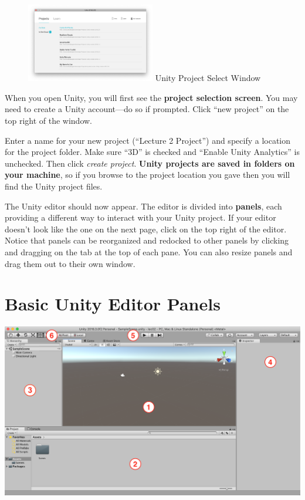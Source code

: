 \documentclass[11pt]{article}
\begin{document}
\begin{figure}
    \centering
    \includegraphics[width=0.5\textwidth]{proj-select}
    Unity Project Select Window
\end{figure}


When you open Unity, you will first see the {\bf project selection screen}.  You may need to create a Unity account—do so if prompted.  Click ``new project'' on the top right of the window.

Enter a name for your new project (``Lecture 2 Project'') and specify a location for the project folder.  Make sure ``3D'' is checked and ``Enable Unity Analytics'' is unchecked.  Then click {\it create project}.  \textbf{Unity projects are saved in folders on your machine}, so if you browse to the project location you gave then you will find the Unity project files.

The Unity editor should now appear.  The editor is divided into \textbf{panels}, each providing a different way to interact with your Unity project.  If your editor doesn’t look like the one on the next page, click  on the top right of the editor.  Notice that panels can be reorganized and redocked to other panels by clicking and dragging on the tab at the top of each pane.  You can also resize panels and drag them out to their own window.

\pagebreak
\section{Basic Unity Editor Panels}

{
\centering \noindent
\includegraphics[width=1.0\textwidth]{basic-editor-panes}
}
\end{document}
